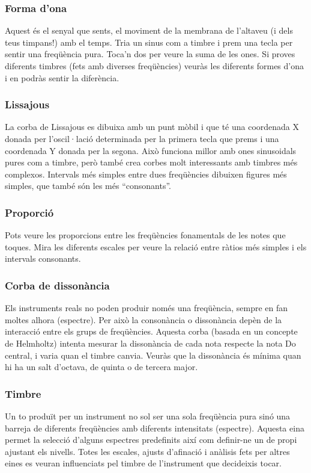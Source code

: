 \subsubsection{Forma d'ona}
Aquest és el senyal que sents, el moviment de la membrana de l'altaveu (i dels teus timpans!) amb el temps. Tria un sinus com a timbre i prem una tecla per sentir una freqüència pura. Toca'n dos per veure la suma de les ones. Si proves diferents timbres (fets amb diverses freqüències) veuràs les diferents formes d'ona i en podràs sentir la diferència. 

\subsubsection{Lissajous}
La corba de Lissajous es dibuixa amb un punt mòbil i que té una coordenada X donada per l'oscil·lació determinada per la primera tecla que prems i una coordenada Y donada per la segona. Això funciona millor amb ones sinusoidals pures com a timbre, però també crea corbes molt interessants amb timbres més complexos. Intervals més simples entre dues freqüències dibuixen figures més simples, que també són les més ``consonants''.

\subsubsection{Proporció}
Pots veure les proporcions entre les freqüències fonamentals de les notes que toques. Mira les diferents escales per veure la relació entre ràtios més simples i els intervals consonants.

\subsubsection{Corba de dissonància}
Els instruments reals no poden produir només una freqüència, sempre en fan moltes alhora (espectre). Per això la consonància o dissonància depèn de la interacció entre els grups de freqüències. Aquesta corba (basada en un concepte de Helmholtz) intenta mesurar la dissonància de cada nota respecte la nota Do central, i varia quan el timbre canvia. Veuràs que la dissonància és mínima quan hi ha un salt d'octava, de quinta o de tercera major.

\subsubsection{Timbre}
Un to produït per un instrument no sol ser una sola freqüència pura sinó una barreja de diferents freqüències amb diferents intensitats (espectre). Aquesta eina permet la selecció d'alguns espectres predefinits així com definir-ne un de propi ajustant els nivells. Totes les escales, ajusts d'afinació i anàlisis fets per altres eines es veuran influenciats pel timbre de l'instrument que decideixis tocar.

